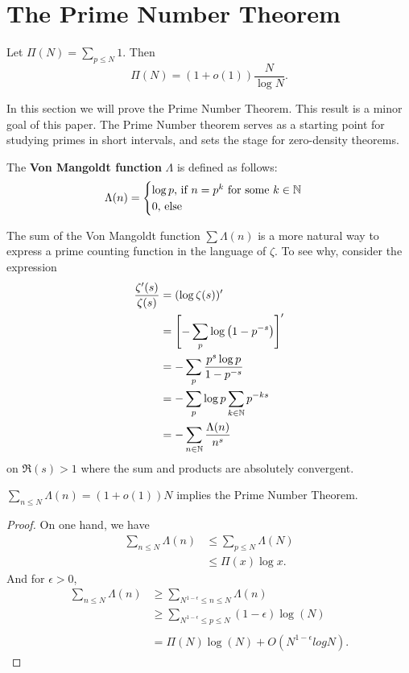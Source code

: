 \section{The Prime Number Theorem}

\begin{theorem}
    Let $\Pi(N)=\sum_{p\leq N} 1$. Then \[
        \Pi(N) = (1+o(1))\frac{N}{\log N}.
    \]
\end{theorem}

In this section we will prove the Prime Number Theorem. This result is a minor goal of this paper.
The Prime Number theorem serves as a starting point for
studying primes in short intervals, and sets the stage for zero-density theorems.
\begin{definition}
    The \textbf{Von Mangoldt function} $\Lambda$ is defined as follows:
    \[
        \Lambda(n) = \begin{cases}
            \log p \textrm{, if $n = p^k$ for some $k\in\mathbb{N}$}\\
            0 \textrm{, else}
        \end{cases}
    \]
\end{definition}
The sum of the Von Mangoldt function $\sum\Lambda (n)$ is a more natural way to express
a prime counting function in the language of $\zeta$. To see why, consider the expression
\begin{align*}
    \frac{\zeta '(s)}{\zeta(s)} &= (\log\zeta(s))'\\
    &= \left[ -\sum_{p} \log\left(1-p^{-s}\right)\right]^{\prime}\\
    &= - \sum_{p} \frac{p^s \log p }{1-p^{-s}}\\
    &= -\sum_{p} \log p \sum_{k\in\mathbb{N}} p^{-ks}\\
    &= - \sum_{n\in\mathbb{N}} \frac{\Lambda(n)}{n^s}
\end{align*}
on $\Re(s)>1$ where the sum and products are absolutely convergent.
\begin{proposition}\label{mangoldtpnt}
    $\sum_{n\leq N} \Lambda(n) = (1+o(1))N$ implies the Prime Number Theorem.
\end{proposition}
\begin{proof}
    On one hand, we have \begin{align*}
        \sum_{n\leq N }\Lambda(n) &\leq \sum_{p \leq N }\Lambda(N)
        \\ &\leq \Pi(x){\log x}.
    \end{align*}
    And for $\epsilon>0$,
    \begin{align*}
        \sum_{n\leq N }\Lambda(n) &\geq \sum_{N^{1-\epsilon}\leq n\leq N }\Lambda(n)
        \\ &\geq \sum_{N^{1-\epsilon}\leq p \leq N }(1-\epsilon) \log(N)\\
        \\&= \Pi(N)\log(N) + O(N^{1-\epsilon}log N).
    \end{align*}
\end{proof}
